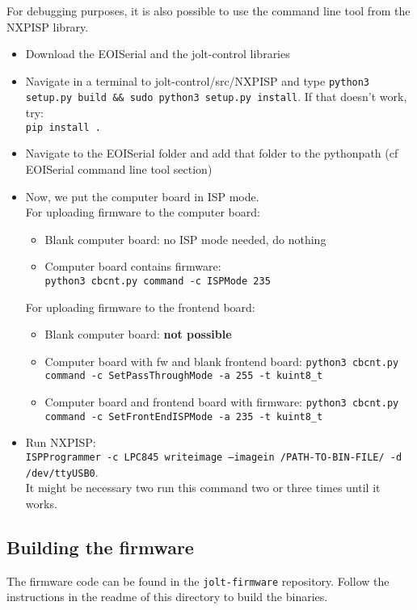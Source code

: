 \documentclass[]{article}
\begin{document}
For debugging purposes, it is also possible to use the command line tool from the NXPISP library.
\begin{itemize}
	\item Download the EOISerial and the jolt-control libraries
	\item Navigate in a terminal to jolt-control/src/NXPISP and type \texttt{python3 setup.py build \&\& sudo python3 setup.py install}. If that doesn't work, try:\\ \texttt{pip install .}
	\item Navigate to the EOISerial folder and add that folder to the pythonpath (cf EOISerial command line tool section)
	\item Now, we put the computer board in ISP mode. \\
	For uploading firmware to the computer board:
	\begin{itemize}
		\item Blank computer board: no ISP mode needed, do nothing
		\item Computer board contains firmware: \\
		\texttt{python3 cbcnt.py command -c ISPMode 235}
	\end{itemize}
	For uploading firmware to the frontend board:
\begin{itemize}
	\item Blank computer board: \textbf{not possible}
	\item Computer board with fw and blank frontend board: \texttt{python3 cbcnt.py command -c SetPassThroughMode -a 255 -t kuint8\_t}
	\item Computer board and frontend board with firmware: \texttt{python3 cbcnt.py command -c SetFrontEndISPMode -a 235 -t kuint8\_t}
\end{itemize}
	\item Run NXPISP:\\
	 \texttt{ISPProgrammer -c LPC845 writeimage --imagein /PATH-TO-BIN-FILE/ -d /dev/ttyUSB0}.\\ It might be necessary two run this command two or three times until it works.

\end{itemize}

\subsection{Building the firmware}
The firmware code can be found in the \texttt{jolt-firmware} repository. Follow the instructions in the readme of this directory to build the binaries.
\end{document}
